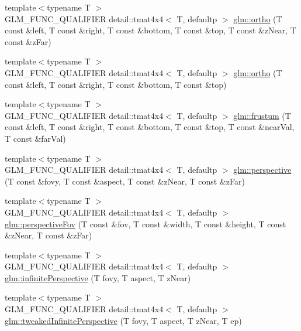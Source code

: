 \begin{DoxyCompactItemize}
\item 
{\footnotesize template$<$typename T $>$ }\\G\+L\+M\+\_\+\+F\+U\+N\+C\+\_\+\+Q\+U\+A\+L\+I\+F\+I\+ER detail\+::tmat4x4$<$ T, defaultp $>$ \hyperlink{group__gtc__matrix__transform_gac393e9262776e4980731c386123e4377}{glm\+::ortho} (T const \&left, T const \&right, T const \&bottom, T const \&top, T const \&z\+Near, T const \&z\+Far)
\item 
{\footnotesize template$<$typename T $>$ }\\G\+L\+M\+\_\+\+F\+U\+N\+C\+\_\+\+Q\+U\+A\+L\+I\+F\+I\+ER detail\+::tmat4x4$<$ T, defaultp $>$ \hyperlink{group__gtc__matrix__transform_gab03587bce3510aa5d2f4e5f1be6c2370}{glm\+::ortho} (T const \&left, T const \&right, T const \&bottom, T const \&top)
\item 
{\footnotesize template$<$typename T $>$ }\\G\+L\+M\+\_\+\+F\+U\+N\+C\+\_\+\+Q\+U\+A\+L\+I\+F\+I\+ER detail\+::tmat4x4$<$ T, defaultp $>$ \hyperlink{group__gtc__matrix__transform_ga486d3d6819c04880559f3dccd38f9f58}{glm\+::frustum} (T const \&left, T const \&right, T const \&bottom, T const \&top, T const \&near\+Val, T const \&far\+Val)
\item 
{\footnotesize template$<$typename T $>$ }\\G\+L\+M\+\_\+\+F\+U\+N\+C\+\_\+\+Q\+U\+A\+L\+I\+F\+I\+ER detail\+::tmat4x4$<$ T, defaultp $>$ \hyperlink{group__gtc__matrix__transform_ga6c82aa0ea748cfbb16887d81cf6c5a10}{glm\+::perspective} (T const \&fovy, T const \&aspect, T const \&z\+Near, T const \&z\+Far)
\item 
{\footnotesize template$<$typename T $>$ }\\G\+L\+M\+\_\+\+F\+U\+N\+C\+\_\+\+Q\+U\+A\+L\+I\+F\+I\+ER detail\+::tmat4x4$<$ T, defaultp $>$ \hyperlink{group__gtc__matrix__transform_gac00bf68d4f7ec62380b84c5354567f71}{glm\+::perspective\+Fov} (T const \&fov, T const \&width, T const \&height, T const \&z\+Near, T const \&z\+Far)
\item 
{\footnotesize template$<$typename T $>$ }\\G\+L\+M\+\_\+\+F\+U\+N\+C\+\_\+\+Q\+U\+A\+L\+I\+F\+I\+ER detail\+::tmat4x4$<$ T, defaultp $>$ \hyperlink{group__gtc__matrix__transform_ga63ba1ddb9c4a08d4e58becd0dc5b725a}{glm\+::infinite\+Perspective} (T fovy, T aspect, T z\+Near)
\item 
{\footnotesize template$<$typename T $>$ }\\G\+L\+M\+\_\+\+F\+U\+N\+C\+\_\+\+Q\+U\+A\+L\+I\+F\+I\+ER detail\+::tmat4x4$<$ T, defaultp $>$ \hyperlink{group__gtc__matrix__transform_gade8abc58c0ac541163e872eb66f3e5de}{glm\+::tweaked\+Infinite\+Perspective} (T fovy, T aspect, T z\+Near, T ep)

\end{DoxyCompactItemize}
